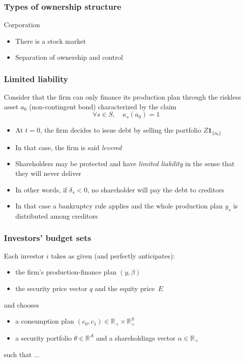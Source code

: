 \documentclass[blue]{beamer}
\def\R{\mathbb{R}}
\def\1{\mathbf{1}}
\theoremstyle{definition}
\theoremstyle{example}
\begin{document}
\begin{frame}\frametitle{Types of ownership structure}

\begin{block}{Corporation}
\begin{itemize}
\item There is a stock market
\item Separation of ownership and control
\end{itemize}
\end{block}

\end{frame}



\begin{frame}\frametitle{Limited liability}

Consider that the firm can only finance its production plan through the riskless asset $a_0$ (non-contingent bond) characterized by the claim
\[
\forall s\in S, \quad \kappa_s(a_0) = 1
\]
\begin{itemize}
\item At $t=0$, the firm decides to issue debt by selling the portfolio $Z \1_{\{a_0\}}$

\item In that case, the firm is said \emph{levered}

\item Shareholders may be protected and have \emph{limited liability} in the sense that they will never deliver

\item In other words, if $\delta_s<0$, no shareholder will pay the debt to creditors

\item In that case a bankruptcy rule applies and the whole production plan $y_s$ is distributed among creditors
\end{itemize}
\end{frame}


\begin{frame}\frametitle{Investors' budget sets}

Each investor $i$ takes as given (and perfectly anticipates):
    \begin{itemize}
    \item the firm's production-finance plan $(y,\beta)$
    \item the security price vector $q$ and the equity price~$E$
    \end{itemize}
and chooses
    \begin{itemize}
    \item a consumption plan $(c_0,c_1) \in \R_+ \times \R^S_+$
    \item a security portfolio $\theta\in \R^A$ and a shareholdings vector $\alpha \in \R_+$
    \end{itemize}
such that ...

\end{frame}
\end{document}
